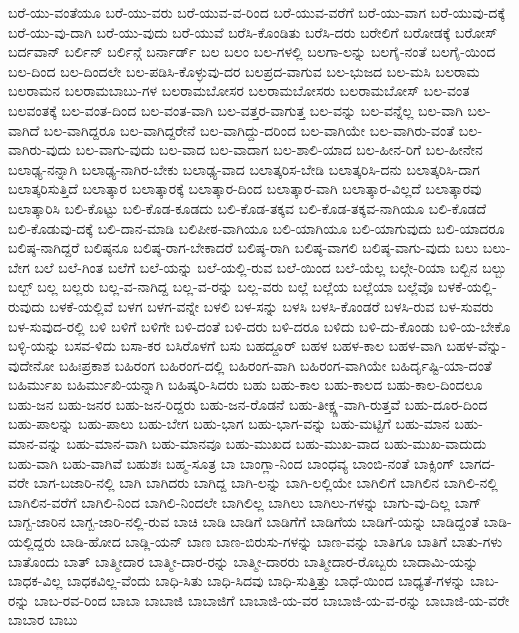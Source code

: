 {ಬರೆ-ಯು-ವಂತೆಯೂ
ಬರೆ-ಯು-ವರು
ಬರೆ-ಯುವ-ವ-ರಿಂದ
ಬರೆ-ಯುವ-ವರೆಗೆ
ಬರೆ-ಯು-ವಾಗ
ಬರೆ-ಯುವು-ದಕ್ಕೆ
ಬರೆ-ಯು-ವು-ದಾಗಿ
ಬರೆ-ಯು-ವುದು
ಬರೆ-ಯುವೆ
ಬರೆಸಿ-ಕೊಂಡಿತು
ಬರೆಸಿ-ದರು
ಬರೇಲಿಗೆ
ಬರೋಡಕ್ಕೆ
ಬರೋಸ್
ಬರ್ದವಾನ್
ಬರ್ಲಿನ್
ಬರ್ಲಿನ್ಗೆ
ಬರ್ನಾರ್ಡ್
ಬಲ
ಬಲಂ
ಬಲ-ಗಳಲ್ಲಿ
ಬಲಗಾ-ಲನ್ನು
ಬಲಗೈ-ನಂತೆ
ಬಲಗೈ-ಯಿಂದ
ಬಲ-ದಿಂದ
ಬಲ-ದಿಂದಲೇ
ಬಲ-ಪಡಿಸಿ-ಕೊಳ್ಳುವು-ದರ
ಬಲಪ್ರದ-ವಾಗುವ
ಬಲ-ಭುಜದ
ಬಲ-ಮಸಿ
ಬಲರಾಮ
ಬಲರಾಮನ
ಬಲರಾಮಬಾಬು-ಗಳ
ಬಲರಾಮಬೋಸರ
ಬಲರಾಮಬೋಸರು
ಬಲರಾಮಬೋಸ್
ಬಲ-ವಂತ
ಬಲವಂತಕ್ಕೆ
ಬಲ-ವಂತ-ದಿಂದ
ಬಲ-ವಂತ-ವಾಗಿ
ಬಲ-ವತ್ತರ-ವಾಗುತ್ತ
ಬಲ-ವನ್ನು
ಬಲ-ವನ್ನೆಲ್ಲ
ಬಲ-ವಾಗಿ
ಬಲ-ವಾಗಿದೆ
ಬಲ-ವಾಗಿದ್ದರೂ
ಬಲ-ವಾಗಿದ್ದರೇನೆ
ಬಲ-ವಾಗಿದ್ದು-ದರಿಂದ
ಬಲ-ವಾಗಿಯೇ
ಬಲ-ವಾಗಿರು-ವಂತೆ
ಬಲ-ವಾಗಿರು-ವುದು
ಬಲ-ವಾಗು-ವುದು
ಬಲ-ವಾದ
ಬಲ-ವಾದಾಗ
ಬಲ-ಶಾಲಿ-ಯಾದ
ಬಲ-ಹೀನ-ರಿಗೆ
ಬಲ-ಹೀನೇನ
ಬಲಾಢ್ಯ-ನನ್ನಾಗಿ
ಬಲಾಢ್ಯ-ನಾಗಿರ-ಬೇಕು
ಬಲಾಢ್ಯ-ವಾದ
ಬಲಾತ್ಕರಿಸ-ಬೇಡಿ
ಬಲಾತ್ಕರಿಸಿ-ದನು
ಬಲಾತ್ಕರಿಸಿ-ದಾಗ
ಬಲಾತ್ಕರಿಸುತ್ತಿದೆ
ಬಲಾತ್ಕಾರ
ಬಲಾತ್ಕಾರಕ್ಕೆ
ಬಲಾತ್ಕಾರ-ದಿಂದ
ಬಲಾತ್ಕಾರ-ವಾಗಿ
ಬಲಾತ್ಕಾರ-ವಿಲ್ಲದೆ
ಬಲಾತ್ಕಾರವು
ಬಲಾತ್ಕಾರಿಸಿ
ಬಲಿ-ಕೊಟ್ಟು
ಬಲಿ-ಕೊಡ-ಕೂಡದು
ಬಲಿ-ಕೊಡ-ತಕ್ಕವ
ಬಲಿ-ಕೊಡ-ತಕ್ಕವ-ನಾಗಿಯೂ
ಬಲಿ-ಕೊಡದೆ
ಬಲಿ-ಕೊಡುವು-ದಕ್ಕೆ
ಬಲಿ-ದಾನ-ಮಾಡಿ
ಬಲಿಪೀಠ-ವಾಗಿಯೂ
ಬಲಿ-ಯಾಗಿಯೂ
ಬಲಿ-ಯಾಗುವುದು
ಬಲಿ-ಯಾದರೂ
ಬಲಿಷ್ಠ-ನಾಗಿದ್ದರೆ
ಬಲಿಷ್ಠನೂ
ಬಲಿಷ್ಠ-ರಾಗ-ಬೇಕಾದರೆ
ಬಲಿಷ್ಠ-ರಾಗಿ
ಬಲಿಷ್ಠ-ವಾಗಲಿ
ಬಲಿಷ್ಠ-ವಾಗು-ವುದು
ಬಲು
ಬಲು-ಬೇಗ
ಬಲೆ
ಬಲೆ-ಗಿಂತ
ಬಲೆಗೆ
ಬಲೆ-ಯನ್ನು
ಬಲೆ-ಯಲ್ಲಿ-ರುವ
ಬಲೆ-ಯಿಂದ
ಬಲೆ-ಯೆಲ್ಲ
ಬಲ್ಗೇ-ರಿಯಾ
ಬಲ್ಬಿನ
ಬಲ್ಬು
ಬಲ್ಬ್
ಬಲ್ಲ
ಬಲ್ಲರು
ಬಲ್ಲ-ವ-ನಾಗಿದ್ದ
ಬಲ್ಲ-ವ-ರನ್ನು
ಬಲ್ಲ-ವರು
ಬಲ್ಲೆ
ಬಲ್ಲೆಯ
ಬಲ್ಲೆಯಾ
ಬಲ್ಲೆವೊ
ಬಳಕೆ-ಯಲ್ಲಿ-ರುವುದು
ಬಳಕೆ-ಯಲ್ಲಿವೆ
ಬಳಗ
ಬಳಗ-ವನ್ನೇ
ಬಳಲಿ
ಬಳ-ಸನ್ನು
ಬಳಸಿ
ಬಳಸಿ-ಕೊಂಡರೆ
ಬಳಸಿ-ರುವ
ಬಳ-ಸುವರು
ಬಳ-ಸುವುದ-ರಲ್ಲಿ
ಬಳಿ
ಬಳಿಗೆ
ಬಳಿಗೇ
ಬಳಿ-ದಂತೆ
ಬಳಿ-ದರು
ಬಳಿ-ದರೂ
ಬಳಿದು
ಬಳಿ-ದು-ಕೊಂಡು
ಬಳಿ-ಯ-ಬೇಕೊ
ಬಳ್ಳಿ-ಯನ್ನು
ಬಸವ-ಳಿದು
ಬಸಾ-ಕರ
ಬಸಿರೊಳಗೆ
ಬಸು
ಬಹದ್ದೂರ್
ಬಹಳ
ಬಹಳ-ಕಾಲ
ಬಹಳ-ವಾಗಿ
ಬಹಳ-ವೆನ್ನು-ವುದೇನೋ
ಬಹಿಃಪ್ರಕಾಶ
ಬಹಿರಂಗ
ಬಹಿರಂಗ-ದಲ್ಲಿ
ಬಹಿರಂಗ-ವಾಗಿ
ಬಹಿರಂಗ-ವಾಗಿಯೇ
ಬಹಿರ್ದೃಷ್ಟಿ-ಯಾ-ದಂತೆ
ಬಹಿರ್ಮುಖ
ಬಹಿರ್ಮುಖಿ-ಯನ್ನಾಗಿ
ಬಹಿಷ್ಕರಿ-ಸಿದರು
ಬಹು
ಬಹು-ಕಾಲ
ಬಹು-ಕಾಲದ
ಬಹು-ಕಾಲ-ದಿಂದಲೂ
ಬಹು-ಜನ
ಬಹು-ಜನರ
ಬಹು-ಜನ-ರಿದ್ದರು
ಬಹು-ಜನ-ರೊಡನೆ
ಬಹು-ತೀಕ್ಷ್ಣ-ವಾಗಿ-ರುತ್ತವೆ
ಬಹು-ದೂರ-ದಿಂದ
ಬಹು-ಪಾಲನ್ನು
ಬಹು-ಪಾಲು
ಬಹು-ಬೇಗ
ಬಹು-ಭಾಗ
ಬಹು-ಭಾಗ-ವನ್ನು
ಬಹು-ಮಟ್ಟಿಗೆ
ಬಹು-ಮಾನ
ಬಹು-ಮಾನ-ವನ್ನು
ಬಹು-ಮಾನ-ವಾಗಿ
ಬಹು-ಮಾನವೂ
ಬಹು-ಮುಖದ
ಬಹು-ಮುಖ-ವಾದ
ಬಹು-ಮುಖ-ವಾದುದು
ಬಹು-ವಾಗಿ
ಬಹು-ವಾಗಿವೆ
ಬಹುಶಃ
ಬಹ್ಮ-ಸೂತ್ರ
ಬಾ
ಬಾಂಗ್ಲಾ-ನಿಂದ
ಬಾಂಧವ್ಯ
ಬಾಂಬಿ-ನಂತೆ
ಬಾಕ್ಸಿಂಗ್
ಬಾಗದ-ವರೇ
ಬಾಗ-ಬಜಾರಿ-ನಲ್ಲಿ
ಬಾಗಿ
ಬಾಗಿದರು
ಬಾಗಿದ್ದ
ಬಾಗಿ-ಲನ್ನು
ಬಾಗಿ-ಲಲ್ಲಿಯೇ
ಬಾಗಿಲಿಗೆ
ಬಾಗಿಲಿನ
ಬಾಗಿಲಿ-ನಲ್ಲಿ
ಬಾಗಿಲಿನ-ವರೆಗೆ
ಬಾಗಿಲಿ-ನಿಂದ
ಬಾಗಿಲಿ-ನಿಂದಲೇ
ಬಾಗಿಲಿಲ್ಲ
ಬಾಗಿಲು
ಬಾಗಿಲು-ಗಳನ್ನು
ಬಾಗು-ವು-ದಿಲ್ಲ
ಬಾಗ್
ಬಾಗ್ಬ-ಜಾರಿನ
ಬಾಗ್ಬ-ಜಾರಿ-ನಲ್ಲಿ-ರುವ
ಬಾಚಿ
ಬಾಡಿ
ಬಾಡಿಗೆ
ಬಾಡಿಗೆಗೆ
ಬಾಡಿಗೆಯ
ಬಾಡಿಗೆ-ಯನ್ನು
ಬಾಡಿದ್ದಂತೆ
ಬಾಡಿ-ಯಲ್ಲಿದ್ದರು
ಬಾಡಿ-ಹೋದ
ಬಾಡ್ಲಿ-ಯನ್
ಬಾಣ
ಬಾಣ-ಬಿರುಸು-ಗಳನ್ನು
ಬಾಣ-ವನ್ನು
ಬಾತಿಗೂ
ಬಾತಿಗೆ
ಬಾತು-ಗಳು
ಬಾತೊಂದು
ಬಾತ್
ಬಾತ್ಮೀದಾರ
ಬಾತ್ಮೀ-ದಾರ-ರನ್ನು
ಬಾತ್ಮೀ-ದಾರರು
ಬಾತ್ಮೀದಾರ-ರೊಬ್ಬರು
ಬಾದಾಮಿ-ಯನ್ನು
ಬಾಧಕ-ವಿಲ್ಲ
ಬಾಧಕವಿಲ್ಲ-ವೆಂದು
ಬಾಧಿ-ಸಿತು
ಬಾಧಿ-ಸಿದವು
ಬಾಧಿ-ಸುತ್ತಿತ್ತು
ಬಾಧೆ-ಯಿಂದ
ಬಾಧ್ಯತೆ-ಗಳನ್ನು
ಬಾಬ-ರನ್ನು
ಬಾಬ-ರವ-ರಿಂದ
ಬಾಬಾ
ಬಾಬಾಜಿ
ಬಾಬಾಜಿಗೆ
ಬಾಬಾಜಿ-ಯ-ವರ
ಬಾಬಾಜಿ-ಯ-ವ-ರನ್ನು
ಬಾಬಾಜಿ-ಯ-ವರೇ
ಬಾಬಾರ
ಬಾಬು
}
